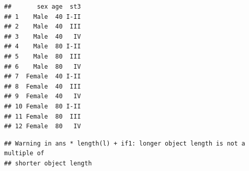\documentclass[
]{book}
\newenvironment{Shaded}{\begin{snugshade}}{\end{snugshade}}
\newcommand{\AttributeTok}[1]{\textcolor[rgb]{0.13,0.29,0.53}{#1}}
\newcommand{\CommentTok}[1]{\textcolor[rgb]{0.56,0.35,0.01}{\textit{#1}}}
\newcommand{\DecValTok}[1]{\textcolor[rgb]{0.00,0.00,0.81}{#1}}
\newcommand{\FunctionTok}[1]{\textcolor[rgb]{0.13,0.29,0.53}{\textbf{#1}}}
\newcommand{\NormalTok}[1]{#1}
\newcommand{\OtherTok}[1]{\textcolor[rgb]{0.56,0.35,0.01}{#1}}
\newcommand{\SpecialCharTok}[1]{\textcolor[rgb]{0.81,0.36,0.00}{\textbf{#1}}}
\newcommand{\StringTok}[1]{\textcolor[rgb]{0.31,0.60,0.02}{#1}}
\begin{document}
\begin{Shaded}
\end{Shaded}

\begin{verbatim}
##       sex age  st3
## 1    Male  40 I-II
## 2    Male  40  III
## 3    Male  40   IV
## 4    Male  80 I-II
## 5    Male  80  III
## 6    Male  80   IV
## 7  Female  40 I-II
## 8  Female  40  III
## 9  Female  40   IV
## 10 Female  80 I-II
## 11 Female  80  III
## 12 Female  80   IV
\end{verbatim}

\begin{Shaded}
\end{Shaded}

\begin{verbatim}
## Warning in ans * length(l) + if1: longer object length is not a multiple of
## shorter object length
\end{verbatim}
\end{document}
